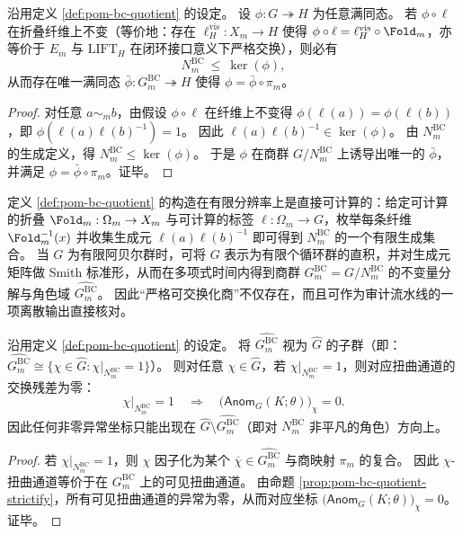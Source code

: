 \begin{proposition}\label{prop:pom-bc-quotient-universal}
沿用定义 \ref{def:pom-bc-quotient} 的设定。
设 \(\phi:G\twoheadrightarrow H\) 为任意满同态。
若 \(\phi\circ \ell\) 在折叠纤维上不变（等价地：存在 \(\ell_H^{\mathrm{vis}}:X_m\to H\) 使得 \(\phi\circ\ell=\ell_H^{\mathrm{vis}}\circ\Fold_m\)，亦等价于 \(E_m\) 与 \(\mathrm{LIFT}_H\) 在闭环接口意义下严格交换），则必有
\[
N^{\mathrm{BC}}_m\ \le\ \ker(\phi),
\]
从而存在唯一满同态 \(\bar\phi:G^{\mathrm{BC}}_m\twoheadrightarrow H\) 使得 \(\phi=\bar\phi\circ \pi_m\)。
\end{proposition}
\begin{proof}
对任意 \(a\sim_m b\)，由假设 \(\phi\circ\ell\) 在纤维上不变得 \(\phi(\ell(a))=\phi(\ell(b))\)，即 \(\phi(\ell(a)\ell(b)^{-1})=1\)。
因此 \(\ell(a)\ell(b)^{-1}\in\ker(\phi)\)。
由 \(N^{\mathrm{BC}}_m\) 的生成定义，得 \(N^{\mathrm{BC}}_m\le \ker(\phi)\)。
于是 \(\phi\) 在商群 \(G/N^{\mathrm{BC}}_m\) 上诱导出唯一的 \(\bar\phi\)，并满足 \(\phi=\bar\phi\circ\pi_m\)。证毕。
\end{proof}

\begin{remark}\label{rem:pom-bc-quotient-computable}
定义 \ref{def:pom-bc-quotient} 的构造在有限分辨率上是直接可计算的：给定可计算的折叠 \(\Fold_m:\Omega_m\to X_m\) 与可计算的标签 \(\ell:\Omega_m\to G\)，枚举每条纤维 \(\Fold_m^{-1}(x)\) 并收集生成元
\(
\ell(a)\ell(b)^{-1}
\)
即可得到 \(N^{\mathrm{BC}}_m\) 的一个有限生成集合。
当 \(G\) 为有限阿贝尔群时，可将 \(G\) 表示为有限个循环群的直积，并对生成元矩阵做 Smith 标准形，从而在多项式时间内得到商群 \(G^{\mathrm{BC}}_m=G/N^{\mathrm{BC}}_m\) 的不变量分解与角色域 \(\widehat{G^{\mathrm{BC}}_m}\)。
因此“严格可交换化商”不仅存在，而且可作为审计流水线的一项离散输出直接核对。
\end{remark}

\begin{corollary}\label{cor:pom-anom-supported-on-bc-kernel}
沿用定义 \ref{def:pom-bc-quotient} 的设定。
将 \(\widehat{G^{\mathrm{BC}}_m}\) 视为 \(\widehat G\) 的子群（即：\(\widehat{G^{\mathrm{BC}}_m}\cong\{\chi\in\widehat G:\chi|_{N^{\mathrm{BC}}_m}=1\}\)）。
则对任意 \(\chi\in\widehat G\)，若 \(\chi|_{N^{\mathrm{BC}}_m}=1\)，则对应扭曲通道的交换残差为零：
\[
\chi|_{N^{\mathrm{BC}}_m}=1
\quad\Longrightarrow\quad
\bigl(\mathsf{Anom}_G(K;\theta)\bigr)_{\chi}=0.
\]
因此任何非零异常坐标只能出现在 \(\widehat G\setminus \widehat{G^{\mathrm{BC}}_m}\)（即对 \(N^{\mathrm{BC}}_m\) 非平凡的角色）方向上。
\end{corollary}
\begin{proof}
若 \(\chi|_{N^{\mathrm{BC}}_m}=1\)，则 \(\chi\) 因子化为某个 \(\overline\chi\in\widehat{G^{\mathrm{BC}}_m}\) 与商映射 \(\pi_m\) 的复合。
因此 \(\chi\)-扭曲通道等价于在 \(G^{\mathrm{BC}}_m\) 上的可见扭曲通道。
由命题 \ref{prop:pom-bc-quotient-strictify}，所有可见扭曲通道的异常为零，从而对应坐标 \(\bigl(\mathsf{Anom}_G(K;\theta)\bigr)_{\chi}=0\)。证毕。
\end{proof}

